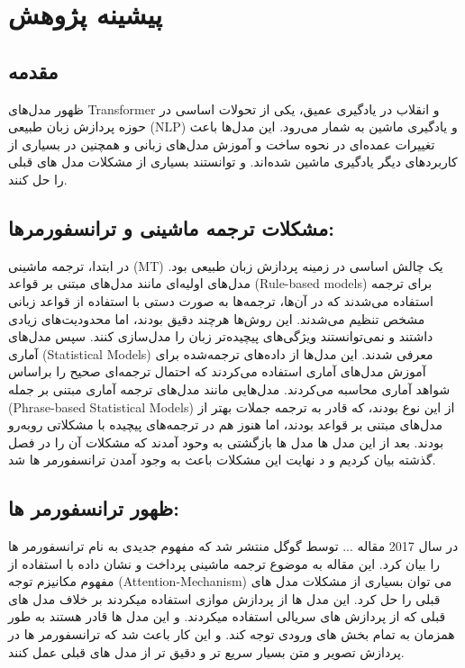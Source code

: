 \texttt{}\chapter{پیشینه پژوهش}

\section{مقدمه}
ظهور مدل‌های Transformer و انقلاب در یادگیری عمیق، یکی از تحولات اساسی در حوزه پردازش زبان طبیعی (NLP) و یادگیری ماشین به شمار می‌رود. این مدل‌ها باعث تغییرات عمده‌ای در نحوه ساخت و آموزش مدل‌های زبانی و همچنین در بسیاری از کاربردهای دیگر یادگیری ماشین شده‌اند. و توانستند بسیاری از مشکلات مدل های قبلی را حل کنند.

\section{مشکلات ترجمه ماشینی و ترانسفورمرها:}
در ابتدا، ترجمه ماشینی (MT) یک چالش اساسی در زمینه پردازش زبان طبیعی بود. مدل‌های اولیه‌ای مانند مدل‌های مبتنی بر قواعد (Rule-based models) برای ترجمه استفاده می‌شدند که در آن‌ها، ترجمه‌ها به صورت دستی با استفاده از قواعد زبانی مشخص تنظیم می‌شدند.
این روش‌ها هرچند دقیق بودند، اما محدودیت‌های زیادی داشتند و نمی‌توانستند ویژگی‌های پیچیده‌تر زبان را مدل‌سازی کنند.
سپس مدل‌های آماری (Statistical Models) معرفی شدند. این مدل‌ها از داده‌های ترجمه‌شده برای آموزش مدل‌های آماری استفاده می‌کردند که احتمال ترجمه‌ای صحیح را براساس شواهد آماری محاسبه می‌کردند. مدل‌هایی مانند مدل‌های ترجمه آماری مبتنی بر جمله (Phrase-based Statistical Models) از این نوع بودند، که قادر به ترجمه جملات بهتر از مدل‌های مبتنی بر قواعد بودند، اما هنوز هم در ترجمه‌های پیچیده با مشکلاتی روبه‌رو بودند.  بعد از این مدل ها مدل ها بازگشتی به وحود آمدند که مشکلات آن را در فصل گذشته بیان کردیم و د نهایت این مشکلات باعث به وجود آمدن ترانسفورمر ها شد.

\section{ظهور ترانسفورمر ها:}
در سال 2017 مقاله ... توسط گوگل منتشر شد که مفهوم جدیدی به نام ترانسفورمر ها را بیان کرد.
این مقاله به موضوع ترجمه ماشینی پرداخت و نشان داده با استفاده از مفهوم مکانیزم توجه (Attention-Mechanism) می توان بسیاری از مشکلات مدل های قبلی را حل کرد.
این مدل ها از پردازش موازی استفاده میکردند بر خلاف مدل های قبلی که از پردازش های سریالی استفاده میکردند. و این مدل ها قادر هستند به طور همزمان به تمام بخش های ورودی توجه کند.
و این کار باعث شد که ترانسفورمر ها در پردازش تصویر و متن بسیار سریع تر و دقیق تر از مدل های قبلی عمل کنند.


